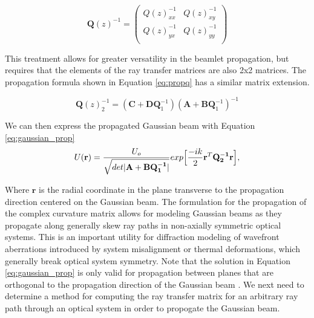 \begin{equation}
    \textbf{Q}(z)^{-1} = 
    \begin{pmatrix}
    Q(z)_{xx}^{-1} & Q(z)_{xy}^{-1} \\
    Q(z)_{yx}^{-1} & Q(z)_{yy}^{-1} \\
    \end{pmatrix}
\end{equation}

This treatment allows for greater versatility in the beamlet propagation, but requires that the elements of the ray transfer matrices are also 2x2 matrices. The propagation formula shown in Equation \ref{eq:propq} has a similar matrix extension.

\begin{equation}
    \mathbf{Q}(z)_{2}^{-1} = (\mathbf{C} + \mathbf{DQ}^{-1}_{1})(\mathbf{A} + \mathbf{BQ}^{-1}_{1})^{-1}
    \label{eq:prop_complex}
\end{equation}

We can then express the propagated Gaussian beam with Equation \ref{eq:gaussian_prop}
\begin{equation}
    U(\mathbf{r}) = \frac{U_{o}}{\sqrt{det|\mathbf{A} + \mathbf{BQ_{1}^{-1}}|}} exp\Bigl[\frac{-ik}{2} \mathbf{r}^{T} \mathbf{Q_{2}^{-1}} \mathbf{r}\Bigr],
    \label{eq:gaussian_prop}
\end{equation}

Where $\mathbf{r}$ is the radial coordinate in the plane transverse to the propagation direction centered on the Gaussian beam. The formulation for the propagation of the complex curvature matrix allows for modeling Gaussian beams as they propagate along generally skew ray paths in non-axially symmetric optical systems. This is an important utility for diffraction modeling of wavefront aberrations introduced by system misalignment or thermal deformations, which generally break optical system symmetry. Note that the solution in Equation \ref{eq:gaussian_prop} is only valid for propagation between planes that are orthogonal to the propagation direction of the Gaussian beam \cite{Collins:70}. We next need to determine a method for computing the ray transfer matrix for an arbitrary ray path through an optical system in order to propogate the Gaussian beam.

